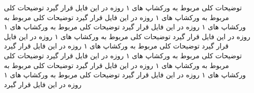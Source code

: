 توضیحات کلی مربوط به ورکشاپ های ۱ روزه در این فایل قرار گیرد توضیحات کلی مربوط به ورکشاپ های ۱ روزه در این فایل قرار گیرد توضیحات کلی مربوط به ورکشاپ های ۱ روزه در این فایل قرار گیرد توضیحات کلی مربوط به ورکشاپ های ۱ روزه در این فایل قرار گیرد توضیحات کلی مربوط به ورکشاپ های ۱ روزه در این فایل قرار گیرد توضیحات کلی مربوط به ورکشاپ های ۱ روزه در این فایل قرار گیرد توضیحات کلی مربوط به ورکشاپ های ۱ روزه در این فایل قرار گیرد توضیحات کلی مربوط به ورکشاپ های ۱ روزه در این فایل قرار گیرد توضیحات کلی مربوط به ورکشاپ های ۱ روزه در این فایل قرار گیرد توضیحات کلی مربوط به ورکشاپ های ۱ روزه در این فایل قرار گیرد 
